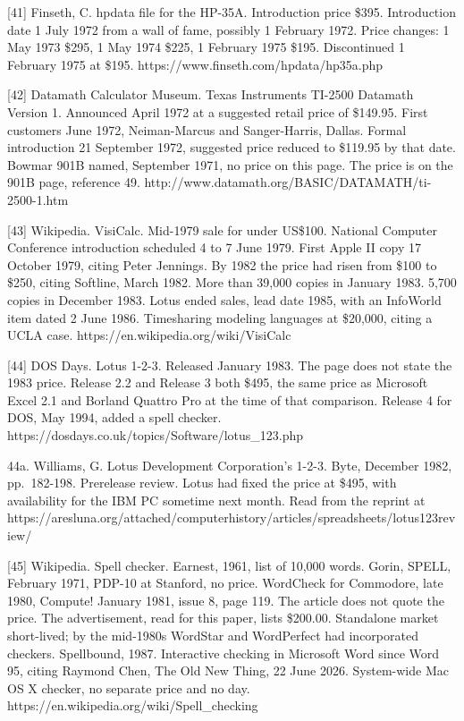 \documentclass[
  10pt,
]{article}
\begin{document}
{[}41{]} Finseth, C. hpdata file for the HP-35A. Introduction price
\$395. Introduction date 1 July 1972 from a wall of fame, possibly 1
February 1972. Price changes: 1 May 1973 \$295, 1 May 1974 \$225, 1
February 1975 \$195. Discontinued 1 February 1975 at \$195.
https://www.finseth.com/hpdata/hp35a.php

{[}42{]} Datamath Calculator Museum. Texas Instruments TI-2500 Datamath
Version 1. Announced April 1972 at a suggested retail price of \$149.95.
First customers June 1972, Neiman-Marcus and Sanger-Harris, Dallas.
Formal introduction 21 September 1972, suggested price reduced to
\$119.95 by that date. Bowmar 901B named, September 1971, no price on
this page. The price is on the 901B page, reference 49.
http://www.datamath.org/BASIC/DATAMATH/ti-2500-1.htm

{[}43{]} Wikipedia. VisiCalc. Mid-1979 sale for under US\$100. National
Computer Conference introduction scheduled 4 to 7 June 1979. First Apple
II copy 17 October 1979, citing Peter Jennings. By 1982 the price had
risen from \$100 to \$250, citing Softline, March 1982. More than 39,000
copies in January 1983. 5,700 copies in December 1983. Lotus ended
sales, lead date 1985, with an InfoWorld item dated 2 June 1986.
Timesharing modeling languages at \$20,000, citing a UCLA case.
https://en.wikipedia.org/wiki/VisiCalc

{[}44{]} DOS Days. Lotus 1-2-3. Released January 1983. The page does not
state the 1983 price. Release 2.2 and Release 3 both \$495, the same
price as Microsoft Excel 2.1 and Borland Quattro Pro at the time of that
comparison. Release 4 for DOS, May 1994, added a spell checker.
https://dosdays.co.uk/topics/Software/lotus\_123.php

44a. Williams, G. Lotus Development Corporation's 1-2-3. Byte, December
1982, pp.~182-198. Prerelease review. Lotus had fixed the price at
\$495, with availability for the IBM PC sometime next month. Read from
the reprint at
https://aresluna.org/attached/computerhistory/articles/spreadsheets/lotus123review/

{[}45{]} Wikipedia. Spell checker. Earnest, 1961, list of 10,000 words.
Gorin, SPELL, February 1971, PDP-10 at Stanford, no price. WordCheck for
Commodore, late 1980, Compute! January 1981, issue 8, page 119. The
article does not quote the price. The advertisement, read for this
paper, lists \$200.00. Standalone market short-lived; by the mid-1980s
WordStar and WordPerfect had incorporated checkers. Spellbound, 1987.
Interactive checking in Microsoft Word since Word 95, citing Raymond
Chen, The Old New Thing, 22 June 2026. System-wide Mac OS X checker, no
separate price and no day. https://en.wikipedia.org/wiki/Spell\_checking
\end{document}

